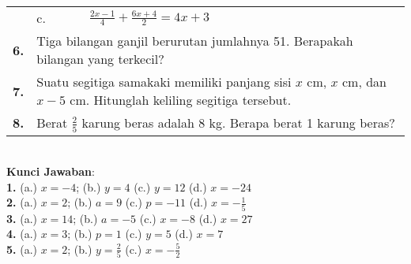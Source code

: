 \documentclass[11pt,a4paper]{article}
\begin{document}
\begin{flushleft}
\begin{tabular}{p{0.3cm}p{0.3cm}p{16cm}}
    &c.&$\frac{2x-1}{4}+\frac{6x+4}{2}=4x+3$\\
   \bf{6.}&\multicolumn{2}{p{16cm}}{Tiga bilangan ganjil berurutan jumlahnya 51. Berapakah bilangan yang terkecil?}\\
   \bf{7.}&\multicolumn{2}{p{16cm}}{Suatu segitiga samakaki memiliki panjang sisi $x$ cm, $x$ cm, dan $x-5$ cm. Hitunglah keliling segitiga tersebut.}\\
   \bf{8.}&\multicolumn{2}{p{16cm}}{Berat $\frac{2}{5}$ karung beras adalah 8 kg. Berapa berat 1 karung beras?}\\
\end{tabular}
\endgroup\\[0.7em]

{\bf Kunci Jawaban}:\\
{\bf 1.} (a.) $x=-4$; \quad (b.) $y=4$ \quad  (c.) $y=12$ \quad (d.) $x=-24$\\
{\bf 2.} (a.) $x=2$; \quad (b.) $a=9$ \quad  (c.) $p=-11$ \quad (d.) $x=-\frac {1}{5}$\\
{\bf 3.} (a.) $x=14$; \quad (b.) $a=-5$ \quad  (c.) $x=-8$ \quad (d.) $x=27$\\
{\bf 4.} (a.) $x=3$; \quad (b.) $p=1$ \quad  (c.) $y=5$ \quad (d.) $x=7$\\
{\bf 5.} (a.) $x=2$; \quad (b.) $y=\frac {2}{5}$ \quad  (c.) $x=-\frac{5}{2}$\\


\end{flushleft}
\end{document}
